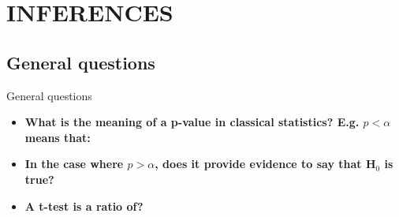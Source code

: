 \documentclass{beamer}
\begin{document}
% 





\section{INFERENCES}

\subsection[General questions]{General questions}

\begin{frame}{General questions}
  \begin{itemize}
    \item \textbf{What is the meaning of a p-value in classical statistics? E.g. $p < \alpha$ means that:}


    \bigskip
    \item \textbf{In the case where $p > \alpha$, does it provide evidence to say that H$_{0}$ is true?}


    \bigskip
    \item \textbf{A t-test is a ratio of?}

% 
  \end{itemize}
\end{frame}  
\end{document}
